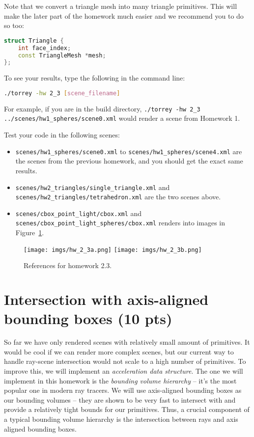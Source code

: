 Note that we convert a triangle mesh into many triangle primitives. This will make the later part of the homework much easier and we recommend you to do so too:
\begin{lstlisting}[language=C++]
struct Triangle {
    int face_index;
    const TriangleMesh *mesh;
};
\end{lstlisting}

To see your results, type the following in the command line:
\begin{lstlisting}[language=bash]
./torrey -hw 2_3 [scene_filename]
\end{lstlisting}
For example, if you are in the build directory, \lstinline{./torrey -hw 2_3 ../scenes/hw1_spheres/scene0.xml} would render a scene from Homework 1.

Test your code in the following scenes: 
\begin{itemize}
  \item \lstinline{scenes/hw1_spheres/scene0.xml} to \lstinline{scenes/hw1_spheres/scene4.xml} are the scenes from the previous homework, and you should get the exact same results. 
  \item \lstinline{scenes/hw2_triangles/single_triangle.xml} and \lstinline{scenes/hw2_triangles/tetrahedron.xml} are the two scenes above.
  \item \lstinline{scenes/cbox_point_light/cbox.xml} and \lstinline{scenes/cbox_point_light_spheres/cbox.xml} renders into images in Figure~\ref{fig:hw_2_3}.
\end{itemize}

\begin{figure}[ht]
    \centering
    \texttt{[image: imgs/hw\_2\_3a.png]}
    \texttt{[image: imgs/hw\_2\_3b.png]}
    \caption{References for homework 2.3.}
    \label{fig:hw_2_3}
\end{figure}

\section{Intersection with axis-aligned bounding boxes (10 pts)}
So far we have only rendered scenes with relatively small amount of primitives. It would be cool if we can render more complex scenes, but our current way to handle ray-scene intersection would not scale to a high number of primitives. To improve this, we will implement an \emph{acceleration data structure}. The one we will implement in this homework is the \emph{bounding volume hierarchy} -- it's the most popular one in  modern ray tracers. We will use axis-aligned bounding boxes as our bounding volumes -- they are shown to be very fast to intersect with and provide a relatively tight bounds for our primitives. Thus, a crucial component of a typical bounding volume hierarchy is the intersection between rays and axis aligned bounding boxes. 

